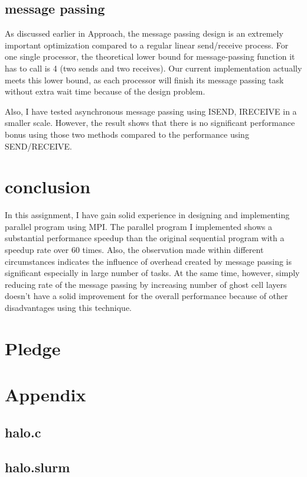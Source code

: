\documentclass{cs4444}
\begin{document}
\subsection{message passing}
As discussed earlier in Approach, the message passing design is an extremely important optimization compared to a regular linear send/receive process. For one single processor, the theoretical lower bound for message-passing function it has to call is 4 (two sends and two receives). Our current implementation actually meets this lower bound, as each processor will finish its message passing task without extra wait time because of the design problem. 

 Also, I have tested asynchronous message passing using ISEND, IRECEIVE in a smaller scale. However, the result shows that there is no significant performance bonus using those two methods compared to the performance using SEND/RECEIVE.
 
\section{conclusion}
In this assignment, I have gain solid experience in designing and implementing parallel program using MPI. The parallel program I implemented shows a substantial performance speedup than the original sequential program with a speedup rate over $60$ times. Also, the observation made within different circumstances indicates the influence of overhead created by message passing is significant especially in large number of tasks. At the same time, however, simply reducing rate of the message passing by increasing number of ghost cell layers doesn't have a solid improvement for the overall performance because of other disadvantages using this technique.  
\section{Pledge}

\pledge
\newpage
\section{Appendix}
\subsection{halo.c}

\newpage
\subsection{halo.slurm}

\end{document}
